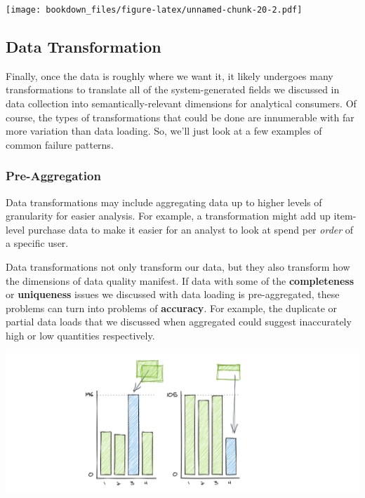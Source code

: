 \documentclass[
]{krantz}
\begin{document}
\texttt{[image: bookdown\_files/figure-latex/unnamed-chunk-20-2.pdf]}

\hypertarget{data-transformation-1}{%
\subsection{Data Transformation}\label{data-transformation-1}}

Finally, once the data is roughly where we want it, it likely undergoes many transformations to translate all of the system-generated fields we discussed in data collection into semantically-relevant dimensions for analytical consumers. Of course, the types of transformations that could be done are innumerable with far more variation than data loading. So, we'll just look at a few examples of common failure patterns.

\hypertarget{pre-aggregation-1}{%
\subsubsection{Pre-Aggregation}\label{pre-aggregation-1}}

Data transformations may include aggregating data up to higher levels of granularity for easier analysis. For example, a transformation might add up item-level purchase data to make it easier for an analyst to look at spend per \emph{order} of a specific user.

Data transformations not only transform our data, but they also transform how the dimensions of data quality manifest. If data with some of the \textbf{completeness} or \textbf{uniqueness} issues we discussed with data loading is pre-aggregated, these problems can turn into problems of \textbf{accuracy}. For example, the duplicate or partial data loads that we discussed when aggregated could suggest inaccurately high or low quantities respectively.

\begin{center}\includegraphics[width=0.9\linewidth]{figures/data-dall/completeness-accuracy} \end{center}
\end{document}
